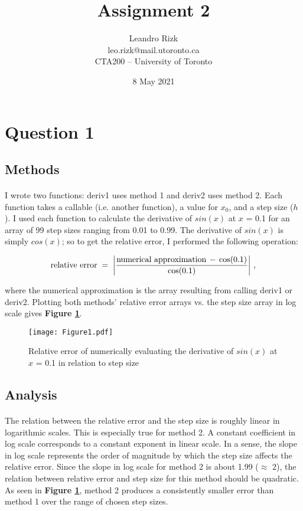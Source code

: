\documentclass{article}
\author{Leandro Rizk \\ leo.rizk@mail.utoronto.ca \\ CTA200 -- University of Toronto}
\title{Assignment 2}
\date{8 May 2021}
\begin{document}
\maketitle



\section{Question 1}

\subsection{Methods}

\paragraph{}
I wrote two functions: deriv1 uses method 1 and deriv2 uses method 2. Each function takes a callable (i.e. another function), a value for $x_0$, and a step size ($h$). I used each function to calculate the derivative of $sin(x)$ at $x$ = 0.1 for an array of 99 step sizes ranging from 0.01 to 0.99. The derivative of $sin(x)$ is simply $cos(x)$; so to get the relative error, I performed the following operation:

$$ \rm{relative\ error} \; = \; \left| \frac{\rm{numerical\ approximation} \, - \, cos(0.1)}{cos(0.1)} \right|  \, ,$$

where the numerical approximation is the array resulting from calling deriv1 or deriv2. Plotting both methods' relative error arrays vs. the step size array in log scale gives \textbf{Figure \ref{fig1}}.

\begin{figure}[H]
\begin{center}
\texttt{[image: Figure1.pdf]}
\caption{Relative error of numerically evaluating the derivative of $sin(x)$ at $x$ = 0.1 in relation to step size \textbf{\label{fig1}}}
\end{center}
\end{figure}

\subsection{Analysis}

\paragraph{}
The relation between the relative error and the step size is roughly linear in logarithmic scales. This is especially true for method 2. A constant coefficient in log scale corresponds to a constant exponent in linear scale. In a sense, the slope in log scale represents the order of magnitude by which the step size affects the relative error. Since the slope in log scale for method 2 is about 1.99 ($\approx$ 2), the relation between relative error and step size for this method should be quadratic. As seen in \textbf{Figure \ref{fig1}}, method 2 produces a consistently smaller error than method 1 over the range of chosen step sizes.
\end{document}
